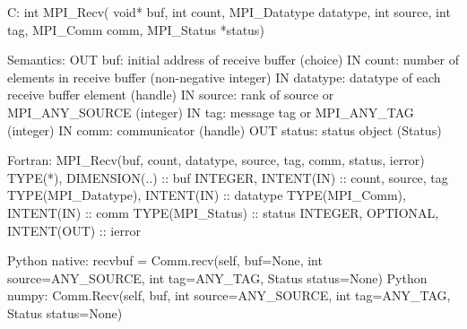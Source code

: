 C:
int MPI_Recv(
  void* buf, int count, MPI_Datatype datatype,
  int source, int tag, MPI_Comm comm, MPI_Status *status)

Semantics:
OUT buf: initial address of receive buffer (choice)
IN count: number of elements in receive buffer (non-negative integer)
IN datatype: datatype of each receive buffer element (handle)
IN source: rank of source or MPI_ANY_SOURCE (integer)
IN tag: message tag or MPI_ANY_TAG (integer)
IN comm: communicator (handle)
OUT status: status object (Status)

Fortran:
MPI_Recv(buf, count, datatype, source, tag, comm, status, ierror)
TYPE(*), DIMENSION(..) :: buf
INTEGER, INTENT(IN) :: count, source, tag
TYPE(MPI_Datatype), INTENT(IN) :: datatype
TYPE(MPI_Comm), INTENT(IN) :: comm
TYPE(MPI_Status) :: status
INTEGER, OPTIONAL, INTENT(OUT) :: ierror

Python native:
recvbuf = Comm.recv(self, buf=None, int source=ANY_SOURCE, int tag=ANY_TAG,
    Status status=None)
Python numpy:
Comm.Recv(self, buf, int source=ANY_SOURCE, int tag=ANY_TAG,
    Status status=None)
